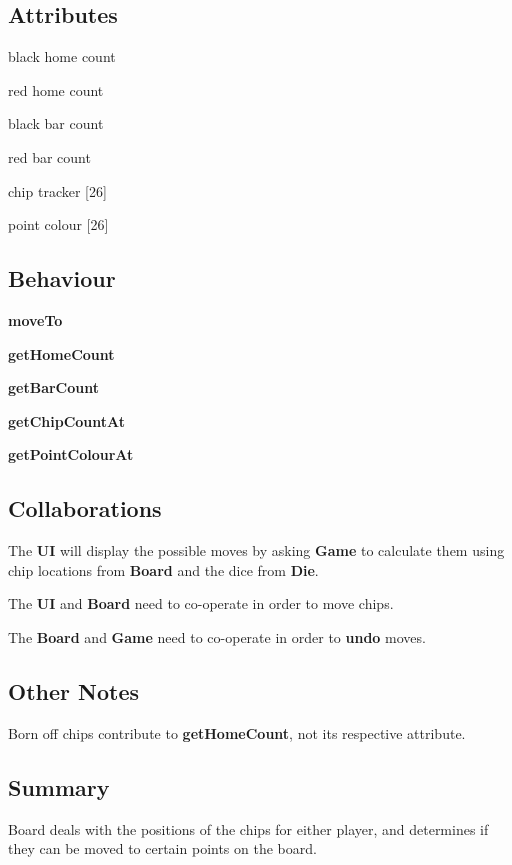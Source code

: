 \begin{multicols}{2}
    \begin{dashed}
        \subsection{Attributes}
        \item black home count
        \item red home count
        \item black bar count
        \item red bar count
        \item chip tracker [26]
        \item point colour [26]
    \end{dashed}

    \begin{dashed}
        \subsection{Behaviour}
        \item \textbf{moveTo}
        \item \textbf{getHomeCount}
        \item \textbf{getBarCount}
        \item \textbf{getChipCountAt}
        \item \textbf{getPointColourAt}
    \end{dashed}
\end{multicols}

\subsection{Collaborations}

\begin{dashed}
    \item The \textbf{UI} will display the possible moves by asking \textbf{Game} to calculate them using chip locations from \textbf{Board} and the dice from \textbf{Die}.
    \item The \textbf{UI} and \textbf{Board} need to co-operate in order to move chips.
    \item The \textbf{Board} and \textbf{Game} need to co-operate in order to \textbf{undo} moves.
\end{dashed}

\subsection{Other Notes}

\begin{dashed}
    \item Born off chips contribute to \textbf{getHomeCount}, not its respective attribute.
\end{dashed}

\subsection{Summary}

Board deals with the positions of the chips for either player, and determines if they can be moved
to certain points on the board.


